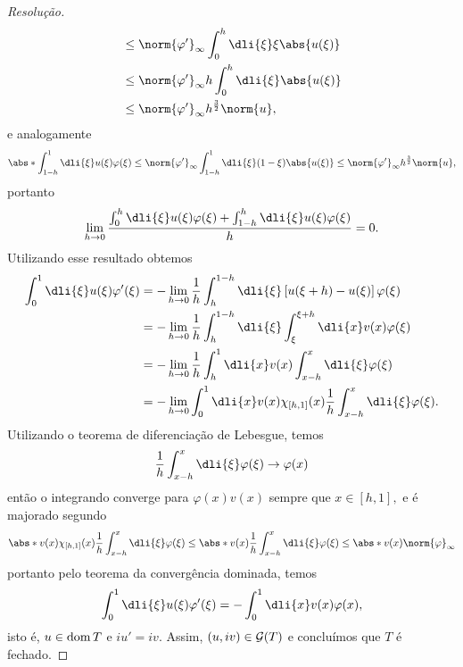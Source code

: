 \begin{proof}[Resolução]
\begin{align*}
                                                 &\leq \norm{\varphi'}_\infty\int_0^h \dli{\xi} \xi \abs{u(\xi)}\\
                                                 &\leq \norm{\varphi'}_\infty h\int_0^h\dli{\xi}\abs{u(\xi)}\\
                                                 &\leq \norm{\varphi'}_\infty h^{\frac32} \norm{u},
  \end{align*}
  e analogamente
  \begin{equation*}
    \abs*{\int_{1-h}^1 \dli{\xi} u(\xi)\varphi(\xi)} \leq \norm{\varphi'}_\infty \int_{1-h}^1 \dli{\xi}(1 - \xi) \abs{u(\xi)} \leq \norm{\varphi'}_{\infty} h^{\frac32}\norm{u},
  \end{equation*}
  portanto
  \begin{equation*}
    \lim_{h\to0} \frac{\int_0^h\dli{\xi} u(\xi) \varphi(\xi) + \int_{1 - h}^h \dli{\xi} u(\xi)\varphi(\xi)}{h} = 0.
  \end{equation*}
  Utilizando esse resultado obtemos
  \begin{align*}
    \int_0^1\dli{\xi} u(\xi)\varphi'(\xi) &= - \lim_{h\to0} \frac1h \int_h^{1-h} \dli{\xi} \left[u(\xi+h) - u(\xi)\right]\varphi(\xi)\\
                                          &= - \lim_{h\to0} \frac1h \int_h^{1-h} \dli{\xi} \int_\xi^{\xi + h} \dli{x} v(x) \varphi(\xi)\\
                                          &= -\lim_{h\to0} \frac1h \int_h^{1} \dli{x} v(x) \int_{x-h}^x \dli{\xi}\varphi(\xi)\\
                                          &= -\lim_{h\to0} \int_0^1\dli{x}v(x) \chi_{[h,1]}(x)\frac1h\int_{x - h}^x \dli{\xi} \varphi(\xi).
  \end{align*}
  Utilizando o teorema de diferenciação de Lebesgue, temos
  \begin{equation*}
    \frac1h\int_{x - h}^x \dli{\xi} \varphi(\xi) \to \varphi(x)
  \end{equation*}
  então o integrando converge para \(\varphi(x)v(x)\) sempre que \(x \in [h,1],\) e é majorado segundo
  \begin{equation*}
    \abs*{v(x) \chi_{[h,1]}(x)\frac1h\int_{x - h}^x \dli{\xi} \varphi(\xi)} \leq \abs*{v(x) \frac1h \int_{x-h}^x\dli{\xi}\varphi(\xi)} \leq \abs*{v(x)}\norm{\varphi}_\infty
  \end{equation*}
  portanto pelo teorema da convergência dominada, temos
  \begin{equation*}
    \int_0^1\dli{\xi}u(\xi)\varphi'(\xi) = -\int_0^1\dli{x}v(x) \varphi(x),
  \end{equation*}
  isto é, \(u \in \operatorname{dom}{T}\) e \(iu' = iv.\) Assim, \((u, iv) \in \mathcal{G}(T)\) e concluímos que \(T\) é fechado.


\end{proof}
